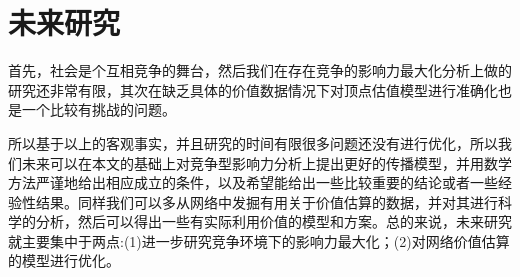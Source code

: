 \section{未来研究}
首先，社会是个互相竞争的舞台，然后我们在存在竞争的影响力最大化分析上做的研究还非常有限，其次在缺乏具体的价值数据情况下对顶点估值模型进行准确化也是一个比较有挑战的问题。

所以基于以上的客观事实，并且研究的时间有限很多问题还没有进行优化，所以我们未来可以在本文的基础上对竞争型影响力分析上提出更好的传播模型，并用数学方法严谨地给出相应成立的条件，以及希望能给出一些比较重要的结论或者一些经验性结果。同样我们可以多从网络中发掘有用关于价值估算的数据，并对其进行科学的分析，然后可以得出一些有实际利用价值的模型和方案。总的来说，未来研究就主要集中于两点:(1)进一步研究竞争环境下的影响力最大化；(2)对网络价值估算的模型进行优化。